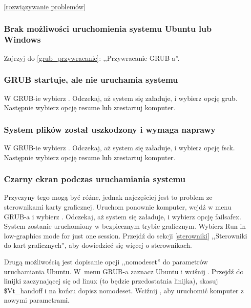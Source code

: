 \ref{rozwiązywanie problemów}
\subsubsection{Brak możliwości uruchomienia systemu Ubuntu lub Windows}
Zajrzyj do \ref{grub_przywracanie}: ,,Przywracanie GRUB-a''.

\subsubsection{GRUB startuje, ale nie uruchamia systemu}
W GRUB-ie wybierz . Odczekaj, aż system się załaduje, i wybierz opcję \textcolor{ubuntu_orange}{grub}. Następnie wybierz opcję \textcolor{ubuntu_orange}{resume} lub zrestartuj komputer.

\subsubsection{System plików został uszkodzony i wymaga naprawy}
W GRUB-ie wybierz . Odczekaj, aż system się załaduje, i wybierz opcję \textcolor{ubuntu_orange}{fsck}. Następnie wybierz opcję \textcolor{ubuntu_orange}{resume} lub zrestartuj komputer.

\subsubsection{Czarny ekran podczas uruchamiania systemu}
Przyczyny tego mogą być różne, jednak najczęściej jest to problem ze sterownikami karty graficznej. Uruchom ponownie komputer, wejdź w menu GRUB-a i wybierz . Odczekaj, aż system się załaduje, i wybierz opcję \textcolor{ubuntu_orange}{failsafex}. System zostanie uruchomiony w bezpiecznym trybie graficznym. Wybierz \textcolor{ubuntu_orange}{Run in low-graphics mode for just one session}. Przejdź do sekcji \ref{sterowniki} ,,Sterowniki do kart graficznych'', aby dowiedzieć się więcej o sterownikach.

Drugą możliwością jest dopisanie opcji ,,nomodeset'' do parametrów uruchamiania Ubuntu. W~menu GRUB-a zaznacz Ubuntu i wciśnij . Przejdź do linijki zaczynającej się od \textcolor{ubuntu_orange}{linux}	(to będzie przedostatnia linijka), skasuj \$Vt\_handoff i na końcu dopisz \textcolor{ubuntu_orange}{nomodeset}. Wciźnij , aby uruchomić komputer z nowymi parametrami.

